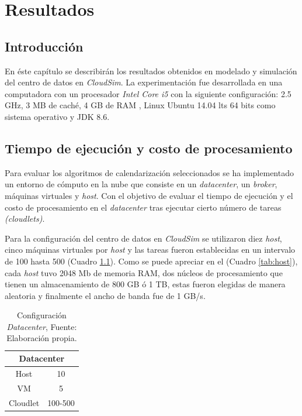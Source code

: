 \chead{}
\rhead{\thepage}


\chapter{Resultados}
\section*{Introducci\'on}

En \'este cap\'itulo se describir\'an los resultados obtenidos en modelado y simulaci\'on del centro de datos en \textit{CloudSim}. La experimentaci\'on fue desarrollada en una computadora con  un procesador \textit{Intel Core i5}  con la siguiente configuraci\'on: 2.5 GHz, 3 MB de cach\'e, 4 GB de RAM , Linux Ubuntu 14.04 lts 64 bits como sistema operativo y JDK 8.6.






\vspace{20em} 

\section{Tiempo de ejecuci\'on y costo de procesamiento}


Para evaluar los algoritmos de calendarizaci\'on seleccionados se ha implementado un entorno de c\'omputo en la nube que consiste en un \textit{datacenter}, un \textit{broker}, m\'aquinas virtuales y \textit{host}.  Con el objetivo de evaluar el tiempo de ejecuci\'on y el costo de procesamiento en el \textit{datacenter} tras ejecutar cierto n\'umero de tareas \textit{(cloudlets)}.

Para la configuraci\'on del centro de datos en \textit{CloudSim} se utilizaron diez \textit{host}, cinco m\'aquinas virtuales por \textit{host} y las tareas fueron establecidas en un intervalo de 100 hasta 500 (Cuadro \ref{table:datacenter}).
Como se puede apreciar en el (Cuadro \ref{tab:host}), cada \textit{host} tuvo 2048 Mb de memoria RAM, dos n\'ucleos de procesamiento que tienen un almacenamiento de 800 GB \'o 1 TB, estas fueron elegidas de manera aleatoria y finalmente el ancho de banda fue de 1 GB/s.

\setcounter{table}{0}
\renewcommand\thetable{\arabic{table}}
\begin{table}[h!]
	\centering
	\begin{tabular}{@{}cc@{}}
		\toprule
		\multicolumn{2}{c}{{\bf Datacenter}} \\ \midrule
		Host              & 10               \\
		VM                & 5                \\
		Cloudlet          & 100-500          \\ \bottomrule
		
	\end{tabular}
	\caption{Configuraci\'on \textit{Datacenter}, Fuente: Elaboraci\'on propia.}
	\label{table:datacenter}
\end{table}
 
